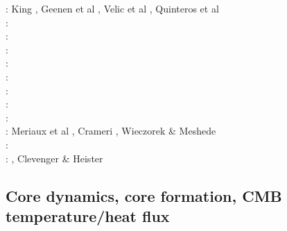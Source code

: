 \begin{scriptsize}
\twothousandnine: King \cite{king09}, Geenen et al \cite{geum09}, Velic et al \cite{vemm09}, 
                  Quinteros et al \cite{qurj09}\\
\twothousandten: \cite{kaus10}\cite{kamm10}\cite{egat10}\cite{kilv10}\\
\twothousandeleven: \cite{dumg11}\cite{uibb11}\cite{hegc11}\cite{muso11}\cite{dawk11}\cite{lemm11}\\
\twothousandtwelve: \cite{crsg12}\cite{chgv12}\cite{krwd12}\cite{may12}\cite{gerb12}\cite{asmo12}\\
\twothousandthirteen: \cite{chtl13}\cite{kemk13}\cite{gemd13}\cite{hutm13}\\
\twothousandfourteen: \cite{thmk14}\cite{mabl14}\cite{lopp14}\cite{stlh14}\\
\twothousandfifteen: \cite{lelk15}\cite{rumi15}\cite{chpe15}\cite{mabl15}\\
\twothousandsixteen: \cite{dumy16}\cite{blmp16}\\
\twothousandseventeen: \cite{robh17}\cite{wisv17}\cite{majc17}\\
\twothousandeighteen: Meriaux et al \cite{memm18}, Crameri \cite{cram18}, Wieczorek \& Meshede \cite{wime18}\\
\twothousandnineteen: \cite{liki19}\cite{demh19}\cite{galb19}\cite{frtv19}\cite{yuwa19}\cite{ropu19}\\
\twothousandtwenty: \cite{homb20}\cite{trlb20}\cite{gadb20}\cite{jaca20a,jaca20b}, Clevenger \& Heister \cite{clhe20}
\end{scriptsize}

\subsection{Core dynamics, core formation, CMB temperature/heat flux}

